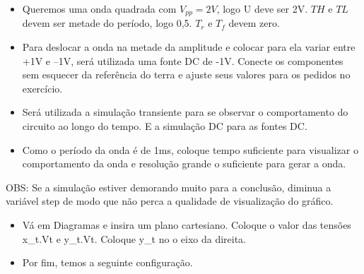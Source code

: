 \begin{itemize}
    \item Queremos uma onda quadrada com $V_{pp}=2V$, logo U
    deve ser 2V. $TH$ e $TL$ devem ser metade do período,
    logo 0,5. $T_r$ e $T_f$ devem zero.
\end{itemize}


\begin{itemize}
    \item Para deslocar a onda na metade da amplitude e
    colocar para ela variar entre +1V e –1V, será utilizada
    uma fonte DC de -1V. Conecte os componentes sem
    esquecer da referência do terra e ajuste seus valores
    para os pedidos no exercício.
\end{itemize}


\begin{itemize}
    \item Será utilizada a simulação transiente para se
    observar o comportamento do circuito ao longo do
    tempo. E a simulação DC para as fontes DC.
\end{itemize}


\begin{itemize}
    \item Como o período da onda é de 1ms, coloque tempo
    suficiente para visualizar o comportamento da onda
    e resolução grande o suficiente para gerar a onda.
\end{itemize}



OBS: Se a simulação estiver demorando muito para a conclusão, diminua a variável step de modo que não perca a qualidade de visualização do gráfico.

\begin{itemize}
    \item Vá em Diagramas e insira um plano cartesiano.
    Coloque o valor das tensões x\_t.Vt e y\_t.Vt. Coloque
    y\_t no o eixo da direita.
\end{itemize}



\begin{itemize}
    \item Por fim, temos a seguinte configuração.
\end{itemize}

